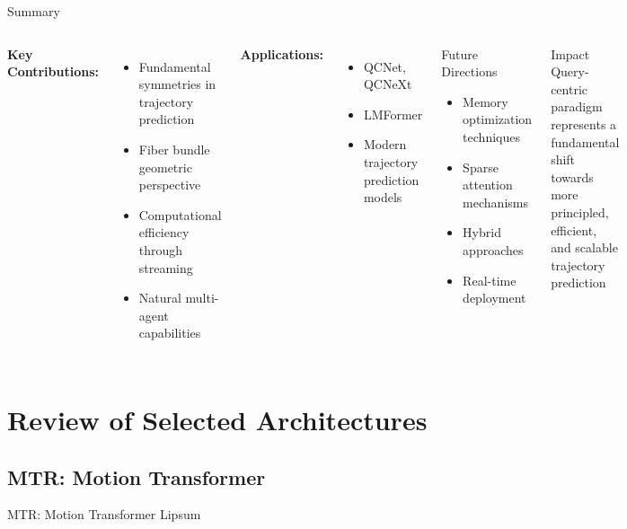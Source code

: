 \documentclass[10pt,aspectratio=169]{beamer}
\begin{document}
\begin{frame}{Summary}
\begin{columns}[T]
\textbf{Key Contributions:}
\begin{itemize}
    \item Fundamental symmetries in trajectory prediction
    \item Fiber bundle geometric perspective
    \item Computational efficiency through streaming
    \item Natural multi-agent capabilities
\end{itemize}

\textbf{Applications:}
\begin{itemize}
    \item QCNet, QCNeXt
    \item LMFormer
    \item Modern trajectory prediction models
\end{itemize}

\begin{block}{Future Directions}
\begin{itemize}
    \item Memory optimization techniques
    \item Sparse attention mechanisms
    \item Hybrid approaches
    \item Real-time deployment
\end{itemize}
\end{block}

\begin{alertblock}{Impact}
Query-centric paradigm represents a fundamental shift towards more principled, efficient, and scalable trajectory prediction
\end{alertblock}
\end{columns}
\end{frame}


\section{Review of Selected Architectures}

\subsection{MTR: Motion Transformer}
\begin{frame}{MTR: Motion Transformer}
    Lipsum
\end{frame}
\end{document}
